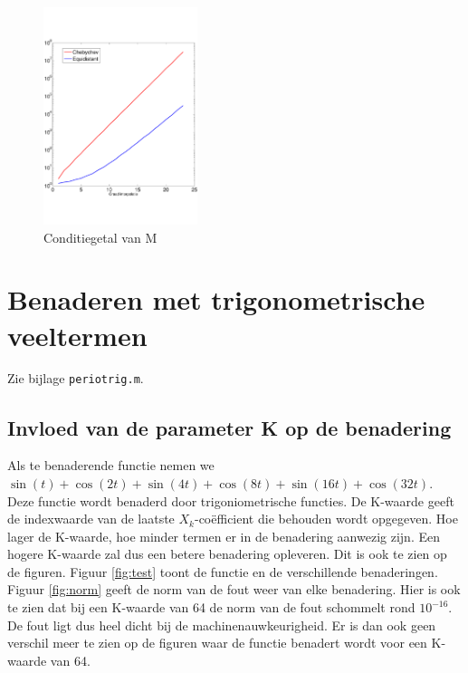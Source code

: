 \documentclass[a4paper, 12pt, titlepage]{report}
\begin{document}
 \begin{center}
 \begin{figure}[!hb]
 \centering
  	\includegraphics[width=0.4\textwidth]{condition.pdf}
  	\caption{Conditiegetal van M}
  	\label{condition}
  \end{figure}
 \end{center}
 
\section{Benaderen met trigonometrische veeltermen}
Zie bijlage \texttt{periotrig.m}.
\subsection{Invloed van de parameter K op de benadering}
Als te benaderende functie nemen we $\sin(t) + \cos(2t) + \sin(4t) + \cos(8t) + \sin(16t) + \cos(32t)$. Deze functie wordt benaderd door trigoniometrische functies. De K-waarde geeft de indexwaarde van de laatste $X_k$-co\"efficient die behouden wordt opgegeven. Hoe lager de K-waarde, hoe minder termen er in de benadering aanwezig zijn. Een hogere K-waarde zal dus een betere benadering opleveren. Dit is ook te zien op de figuren. Figuur \ref{fig:test} toont de functie en de verschillende benaderingen. Figuur \ref{fig:norm} geeft de norm van de fout weer van elke benadering. Hier is ook te zien dat bij een K-waarde van 64 de norm van de fout schommelt rond $10^{-16}$. De fout ligt dus heel dicht bij de machinenauwkeurigheid. Er is dan ook geen verschil meer te zien op de figuren waar de functie benadert wordt voor een K-waarde van 64.
\end{document}
